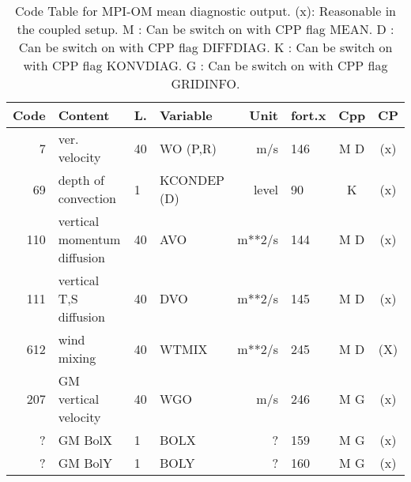 \begin{table}
\begin{footnotesize}
\begin{tabular}{r|l|l|l|r|l|c|c}
Code & Content  		       & L.    &  Variable	&   Unit    &	 fort.x &  Cpp  &    CP    \\ \hline
  7  & ver. velocity		       & 40    &  WO   (P,R)	&   m/s     &	146	&  M D  &    (x)   \\
 69  & depth of convection	       &  1    &  KCONDEP (D)	&   level   &	 90	&  K	&    (x)   \\
110  & vertical momentum diffusion       & 40    &  AVO		&   m**2/s  &  144     &  M D  &    (x)   \\
111  & vertical T,S diffusion	       & 40    &  DVO		&   m**2/s  &  145     &  M D  &    (x)   \\
612  & wind mixing		       & 40    &  WTMIX 	&   m**2/s  &  245     &  M D  &    (X)   \\
207  & GM vertical velocity	       & 40    &  WGO		&   m/s     &  246     &  M G  &    (x)   \\
?    & GM BolX  		       &  1    &  BOLX  	&   ?	    &  159     &  M G  &    (x)   \\
?    & GM BolY  		       &  1    &  BOLY  	&   ?	    &  160     &  M G  &    (x)   \\
\end{tabular}
\end{footnotesize}
\caption{Code Table for MPI-OM mean diagnostic output. \newline
(x): Reasonable in the coupled setup.\newline
 M : Can be switch on with CPP flag MEAN.\newline
 D : Can be switch on with CPP flag DIFFDIAG. \newline
 K : Can be switch on with CPP flag KONVDIAG. \newline
 G : Can be switch on with CPP flag GRIDINFO.}
\label{tb:diagnostic:output:mean diag}
\end{table}


